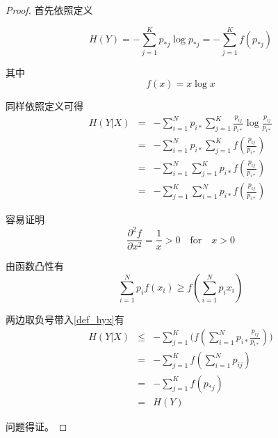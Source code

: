 \begin{proof}
    首先依照定义

    \begin{equation}
        H(Y) = -\sum_{j=1}^Kp_{*j}\log p_{*j} = -\sum_{j=1}^K f(p_{*j})
    \end{equation}

    其中
    \begin{equation*}
        f(x) = x\log x
    \end{equation*}

    同样依照定义可得
    \begin{equation}\label{def_hyx}
        \begin{array}{rcl}
            H(Y|X) & = & -\sum_{i=1}^Np_{i*} \sum_{j=1}^K\frac{p_{ij}}{p_{i*}}\log \frac{p_{ij}}{p_{i*}} \\
                   & = & -\sum_{i=1}^Np_{i*} \sum_{j=1}^Kf(\frac{p_{ij}}{p_{i*}})                        \\
                   & = & -\sum_{i=1}^N\sum_{j=1}^K p_{i*}f(\frac{p_{ij}}{p_{i*}})                        \\
                   & = & -\sum_{j=1}^K\sum_{i=1}^N p_{i*}f(\frac{p_{ij}}{p_{i*}})
        \end{array}
    \end{equation}

    容易证明
    \begin{equation*}
        \frac{\partial^2 f}{\partial x^2} = \frac{1}{x} > 0 \quad \text{for} \quad x > 0
    \end{equation*}

    由函数凸性有
    \begin{equation*}
        \sum_{i=1}^N p_i f(x_i) \geq f(\sum_{i=1}^N p_i x_i)
    \end{equation*}

    两边取负号带入\ref{def_hyx}有
    \begin{equation}
        \begin{array}{rcl}
            H(Y|X) & \leq & -\sum_{j=1}^K\big(f(\sum_{i=1}^N p_{i*} \frac{p_{ij}}{p_{i*}})\big) \\
                   & =    & -\sum_{j=1}^Kf(\sum_{i=1}^Np_{ij})                                  \\
                   & =    & -\sum_{j=1}^Kf(p_{*j})                                              \\
                   & =    & H(Y)
        \end{array}
    \end{equation}

    问题得证。
\end{proof}

